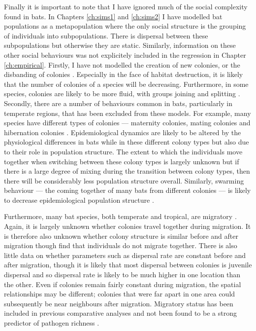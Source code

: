Finally it is important to note that I have ignored much of the social complexity found in bats.
In Chapters \ref{ch:sims1} and \ref{ch:sims2} I have modelled bat populations as a metapopulation where the only social structure is the grouping of individuals into subpopulations.
There is dispersal between these subpopulations but otherwise they are static.
Similarly, information on these other social behaviours was not explicitely included in the regression in Chapter \ref{ch:empirical}.
Firstly, I have not modelled the creation of new colonies, or the disbanding of colonies \cite{metheny2008genetic}.
Especially in the face of habitat destruction, it is likely that the number of colonies of a species will be decreasing.
Furthermore, in some species, colonies are likely to be more fluid, with groups joining and splitting \cite{kerth2012causes, august2014sympatric}.
Secondly, there are a number of behaviours common in bats, particularly in temperate regions, that has been excluded from these models.
For example, many species have different types of colonies --- maternity colonies, mating colonies and hibernation colonies \cite{kerth2008causes}.
Epidemiological dynamics are likely to be altered by the physiological differences in bats while in these different colony types \cite{george2011host, langwig2015host, blehert2012fungal} but also due to their role in population structure.
The extent to which the individuals move together when switching between these colony types is largely unknown \cite{kurta2002philopatry} but if there is a large degree of mixing during the transition between colony types, then there will be considerably less population structure overall.
Similarly, swarming behaviour --- the coming together of many bats from different colonies --- is likely to decrease epidemiological population structure \cite{kerth2012causes}.


Furthermore, many bat species, both temperate and tropical, are migratory \cite{fleming2003ecology, krauel2013recent, popa2009bats, hutterer2005bat}.
Again, it is largely unknown whether colonies travel together during migration. 
It is therefore also unknown whether colony structure is similar before and after migration \cite{carter2013cooperation} though \textcite{kurta2002philopatry} find that individuals do not migrate together.
There is also little data on whether parameters such as dispersal rate are constant before and after migration, though it is likely that most dispersal between colonies is juvenile dispersal and so dispersal rate is likely to be much higher in one location than the other.
Even if colonies remain fairly constant during migration, the spatial relationships may be different; colonies that were far apart in one area could subsequently be near neighbours after migration.
Migratory status has been included in previous comparative analyses and not been found to be a strong predictor of pathogen richness \cite{turmelle2009correlates, maganga2014bat}. 

